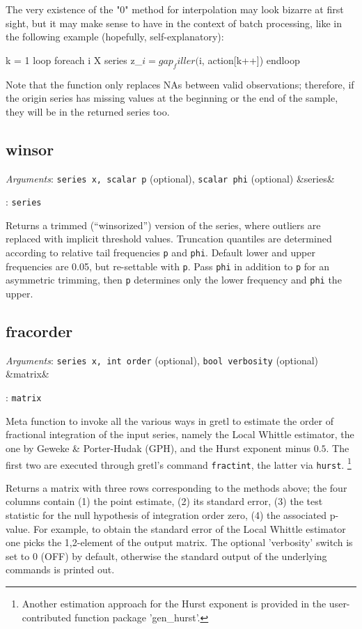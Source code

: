 \documentclass[11pt,english]{article}
\newcommand{\ArgRet}[2]{%
  {\it Arguments}: {#1}%
  \ifx&#2&%
  \else
  \par\smallskip\noindent {\it Return type}: \texttt{#2}
  \fi%
  \par\medskip\par%
  }
\begin{document}
The very existence of the "0" method for interpolation may look
bizarre at first sight, but it may make sense to have in the context
of batch processing, like in the following example (hopefully,
self-explanatory):
\begin{code}
k = 1
loop foreach i X
   series z_$i = gap_filler($i, action[k++])
endloop
\end{code}

Note that the function only replaces NAs between valid observations;
therefore, if the origin series has missing values at the beginning or
the end of the sample, they will be in the returned series too.

\subsection{winsor}

\ArgRet{\texttt{series x, scalar p} (optional), \texttt{scalar
phi} (optional)}{series}

Returns a trimmed (``winsorized'') version
of the series, where outliers are replaced with implicit threshold
values. Truncation quantiles are determined according to relative
tail frequencies \texttt{p} and \texttt{phi}. Default lower and upper
frequencies are 0.05, but re-settable with \texttt{p}. Pass \texttt{phi}
in addition to \texttt{p} for an asymmetric trimming, then \texttt{p}
determines only the lower frequency and \texttt{phi} the upper.

\subsection{fracorder}

\ArgRet{\texttt{series x, int order} (optional), \texttt{bool verbosity} (optional)}{matrix}

Meta function to invoke all the various ways in gretl to estimate the order of fractional
integration of the input series, namely the Local Whittle estimator, the one by
Geweke \& Porter-Hudak (GPH), and the Hurst exponent minus $0.5$. The first two
are executed through gretl's command \texttt{fractint}, the latter via \texttt{hurst}.%
\footnote{Another estimation approach for the Hurst exponent is provided in the
user-contributed function package 'gen\_hurst'.}

Returns a matrix with three rows corresponding to the methods above; the four columns
contain (1) the point estimate, (2) its standard error, (3) the test statistic for the null
hypothesis of integration order zero, (4) the associated p-value. For example, to obtain
the standard error of the Local Whittle estimator one picks the 1,2-element of the output
matrix. The optional 'verbosity' switch is set to 0 (OFF) by default, otherwise the standard
output of the underlying commands is printed out.
\end{document}
